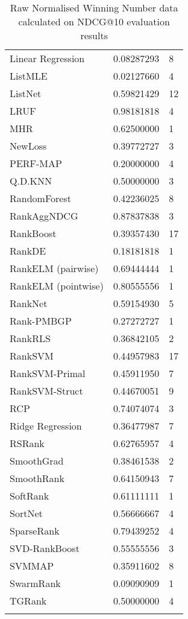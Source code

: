 \begin{longtable}{l|l|l}
Linear Regression & 0.08287293 & 8 \\ 
List\acs{MLE} & 0.02127660 & 4 \\ 
ListNet & 0.59821429 & 12 \\ 
LRUF & 0.98181818 & 4 \\ 
MHR & 0.62500000 & 1 \\ 
NewLoss & 0.39772727 & 3 \\ 
PERF-\acs{MAP} & 0.20000000 & 4 \\ 
Q.D.\acs{KNN} & 0.50000000 & 3 \\ 
RandomForest & 0.42236025 & 8 \\ 
RankAgg\acs{NDCG} & 0.87837838 & 3 \\ 
RankBoost & 0.39357430 & 17 \\ 
RankDE & 0.18181818 & 1 \\ 
RankELM (pairwise) & 0.69444444 & 1 \\ 
RankELM (pointwise) & 0.80555556 & 1 \\ 
RankNet & 0.59154930 & 5 \\ 
Rank-PMBGP & 0.27272727 & 1 \\ 
Rank\acs{RLS} & 0.36842105 & 2 \\ 
Rank\acs{SVM} & 0.44957983 & 17 \\ 
Rank\acs{SVM}-Primal & 0.45911950 & 7 \\ 
Rank\acs{SVM}-Struct & 0.44670051 & 9 \\ 
RCP & 0.74074074 & 3 \\ 
Ridge Regression & 0.36477987 & 7 \\ 
RSRank & 0.62765957 & 4 \\ 
SmoothGrad & 0.38461538 & 2 \\ 
SmoothRank & 0.64150943 & 7 \\ 
SoftRank & 0.61111111 & 1 \\ 
SortNet & 0.56666667 & 4 \\ 
SparseRank & 0.79439252 & 4 \\ 
\acs{SVD}-RankBoost & 0.55555556 & 3 \\ 
\acs{SVM}\acs{MAP} & 0.35911602 & 8 \\ 
SwarmRank & 0.09090909 & 1 \\ 
TGRank & 0.50000000 & 4 \\ 
\caption{Raw Normalised Winning Number data calculated on \acs{NDCG}@10 evaluation results}
\label{tab:raw_data_norm_winnum_ndcg10}
\end{longtable}